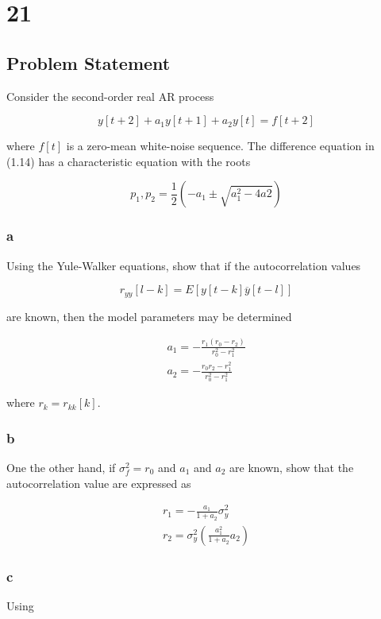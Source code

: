 \documentclass[11pt,a4paper,final]{article}
\begin{document}
\section{21}
\label{sec:orgfaf4c3f}
\subsection{Problem Statement}
\label{sec:orgc48a55b}
Consider the second-order real AR process

$$
y[t+2] + a_1y[t+1] + a_2y[t] = f[t+2]
$$

where \(f[t]\) is a zero-mean white-noise sequence. The difference equation in (1.14) has a characteristic equation with
the roots

$$
p_1, p_2 = \frac{1}{2} (-a_1 \pm \sqrt{a_1^2 - 4 a2})
$$

\subsubsection{a}
\label{sec:org7205dfd}
Using the Yule-Walker equations, show that if the autocorrelation values

$$
r_{yy} [l-k] = E[y[t-k]\overline{y}[t-l]]
$$

are known, then the model parameters may be determined

\begin{equation*}
\begin{array}{l}
a_1 = - \frac{r_1(r_0 - r_2)}{r_0^2 - r_1^2} \\
a_2 = - \frac{r_0 r_2 - r_1^2}{r_0^2 - r_1^2}
\end{array}
\end{equation*}

where \(r_k = r_{kk}[k]\).

\subsubsection{b}
\label{sec:org5c19665}
One the other hand, if \(\sigma_f^2 = r_0\) and \(a_1\) and \(a_2\) are known, show that the autocorrelation value are expressed as

\begin{equation*}
\begin{array}{l}
r_1 = - \frac{a_1}{1+a_2}\sigma_y^2 \\
r_2 = \sigma_y^2 (\frac{a_1^2}{1+a_2} a_2)
\end{array}
\end{equation*}

\subsubsection{c}
\label{sec:org4a577dc}
Using
\end{document}
